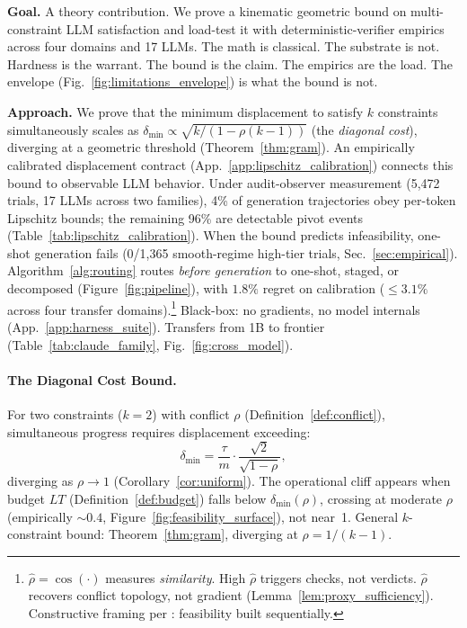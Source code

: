 \documentclass{article}
\theoremstyle{plain}
\theoremstyle{definition}
\theoremstyle{remark}
\newcommand{\rhohat}{\hat{\rho}}
\newcommand{\secref}[1]{Sec.~\ref{#1}}
\begin{document}
\textbf{Goal.} A theory contribution. We prove a kinematic geometric bound on multi-constraint LLM satisfaction and load-test it with deterministic-verifier empirics across four domains and 17 LLMs. The math is classical. The substrate is not. Hardness is the warrant. The bound is the claim. The empirics are the load. The envelope (Fig.~\ref{fig:limitations_envelope}) is what the bound is not.

\textbf{Approach.} We prove that the minimum displacement to satisfy $k$ constraints simultaneously scales as $\delta_{\min} \propto \sqrt{k/(1{-}\rho(k{-}1))}$ (the \emph{diagonal cost}), diverging at a geometric threshold (Theorem~\ref{thm:gram}). An empirically calibrated displacement contract (App.~\ref{app:lipschitz_calibration}) connects this bound to observable LLM behavior. Under audit-observer measurement (5{,}472 trials, 17 LLMs across two families), 4\% of generation trajectories obey per-token Lipschitz bounds; the remaining 96\% are detectable pivot events (Table~\ref{tab:lipschitz_calibration}). When the bound predicts infeasibility, one-shot generation fails (0/1{,}365 smooth-regime high-tier trials, \secref{sec:empirical}). Algorithm~\ref{alg:routing} routes \emph{before generation} to one-shot, staged, or decomposed (Figure~\ref{fig:pipeline}), with $1.8\%$ regret on calibration ($\le 3.1\%$ across four transfer domains).\footnote{$\rhohat=\cos(\cdot)$ measures \emph{similarity}. High $\rhohat$ triggers checks, not verdicts. $\rhohat$ recovers conflict topology, not gradient (Lemma~\ref{lem:proxy_sufficiency}). Constructive framing per \citep{piaget1954construction}: feasibility built sequentially.} Black-box: no gradients, no model internals (App.~\ref{app:harness_suite}). Transfers from 1B to frontier (Table~\ref{tab:claude_family}, Fig.~\ref{fig:cross_model}).

\paragraph{The Diagonal Cost Bound.}
For two constraints ($k{=}2$) with conflict $\rho$ (Definition~\ref{def:conflict}), simultaneous progress requires displacement exceeding:
\[
\delta_{\min} = \frac{\tau}{m} \cdot \frac{\sqrt{2}}{\sqrt{1-\rho}},
\]
diverging as $\rho \to 1$ (Corollary~\ref{cor:uniform}). The operational cliff appears when budget $LT$ (Definition~\ref{def:budget}) falls below $\delta_{\min}(\rho)$, crossing at moderate $\rho$ (empirically ${\sim}0.4$, Figure~\ref{fig:feasibility_surface}), not near~1. General $k$-constraint bound: Theorem~\ref{thm:gram}, diverging at $\rho = 1/(k{-}1)$.
\end{document}
